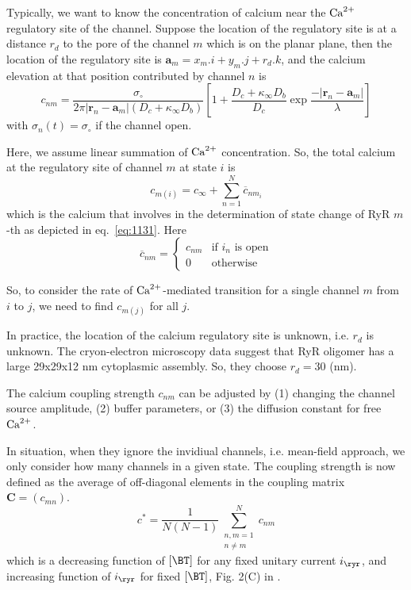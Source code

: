 Typically, we want to know the concentration of calcium near the ${\text{Ca}^{2+}}$
regulatory site of the channel. Suppose the location of the regulatory site is
at a distance $r_d$ to the pore of the channel $m$ which is on the planar plane,
then the location of the regulatory site is $\mathbf{a}_m=x_m.i+y_m.j+r_d.k$,
and the calcium elevation at that position contributed by channel $n$ is
\begin{equation}
  \label{eq:1147}
  c_{nm}=\frac{\sigma_\circ}{2\pi|\mathbf{r}_n-\mathbf{a}_m|(D_c+\kappa_\infty
    D_b)}\left[1+\frac{D_c+ \kappa_\infty
    D_b}{D_c}\exp\frac{-|\mathbf{r}_n-\mathbf{a}_m|}{\lambda}\right]
\end{equation}
with $\sigma_n(t)=\sigma_\circ$ if the channel open.

Here, we assume linear summation of ${\text{Ca}^{2+}}$ concentration. So, the total calcium
at the regulatory site of channel $m$ at state $i$ is
\begin{equation}
  \label{eq:1148}
  c_{m(i)} = c_\infty + \sum^N_{n=1} \overline{c}_{nm_i}
\end{equation}
which is the calcium that involves in the determination of state change
of RyR $m$-th as depicted in eq.~\eqref{eq:1131}. Here
\begin{equation}
\overline{c}_{nm} = \left\{ \begin{array}{ll}
c_{nm} & \text{if $i_n$ is open} \\
0 & \text{otherwise}
\end{array}
\right.
\end{equation}

So, to consider the rate of ${\text{Ca}^{2+}}$-mediated transition for a single channel
$m$ from $i$ to $j$, we need to find $c_{m(j)}$ for all $j$.

In practice, the location of the calcium regulatory site is unknown, i.e. $r_d$
is unknown. The cryon-electron microscopy data suggest that RyR oligomer has a
large 29x29x12 nm cytoplasmic assembly. So, they choose $r_d = 30$ (nm). 

\begin{framed}
  The calcium coupling strength $c_{nm}$ can be adjusted by (1)
  changing the channel source amplitude, (2) buffer parameters, or (3)
  the diffusion constant for free ${\text{Ca}^{2+}}$.
\end{framed}

In situation, when they ignore the invidiual channels, i.e. mean-field
approach, we only consider how many channels in a given state. The coupling
strength is now defined as the average of off-diagonal elements in the coupling matrix
$\mathbf{C}=(c_{mn})$.
\begin{equation}
  \label{eq:1149}
  c^* = \frac{1}{N(N-1)}\sum^N_{
    \begin{array}{l}
      n,m=1\\
      n\ne m
    \end{array}
  }
  c_{nm}
\end{equation}
which is a decreasing function of $[\BT]$ for any fixed unitary
current $i_\ryr$, and increasing function of $i_\ryr$ for fixed
$[\BT]$, Fig. 2(C) in \citep{groff2008}. 

